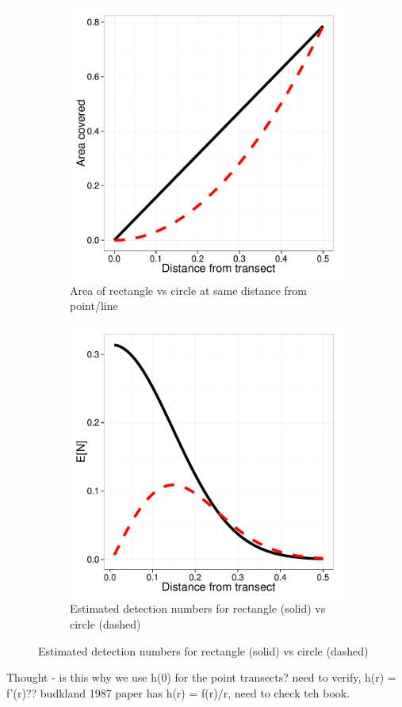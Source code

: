 \documentclass[12pt]{article}
\begin{document}
\begin{figure}
	\centering
	\caption{Squares (Line Transect, solid) vs. Circles (Point Transect, dashed)}
	\begin{subfigure}[b]{0.45\textwidth}
		\includegraphics[width=\textwidth]{../images/rect-circ-area.pdf}
		\caption{Area of rectangle vs circle at same distance from point/line}
		\label{fig:structured}
	\end{subfigure}
	\begin{subfigure}[b]{0.45\textwidth}
		\includegraphics[width=\textwidth]{../images/rect-circ-detection.pdf}
		\caption{Estimated detection numbers for rectangle (solid) vs circle (dashed)}
		\label{fig:structured}
	\end{subfigure}
	

\end{figure}


Thought - is this why we use h(0) for the point transects? need to verify, h(r) = f'(r)??  budkland 1987 paper has h(r) = f(r)/r, need to check teh book.
\end{document}

